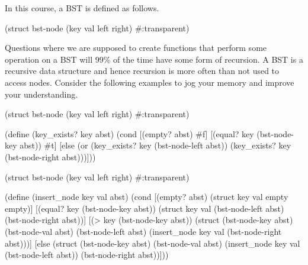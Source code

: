 In this course, a BST is defined as follows.\\

\begin{code}[Lisp]
(struct bst-node (key val left right) #:transparent)
\end{code}

Questions where we are supposed to create functions that perform some operation on a BST will 99\% of the time have some form of recursion. A BST is a recursive data structure and hence recursion is more often than not used to access nodes. Consider the following examples to jog your memory and improve your understanding.\\


\begin{code}[Lisp]
(struct bst-node (key val left right) #:transparent)

(define (key_exists? key abst)
	(cond
		[(empty? abst) #f]
		[(equal? key (bst-node-key abst)) #t]
		[else (or (key_exists? key (bst-node-left abst))
		          (key_exists? key (bst-node-right abst)))]))
\end{code}

\clearpage
{}

\begin{code}[Lisp]
(struct bst-node (key val left right) #:transparent)

(define (insert_node key val abst)
	(cond
		[(empty? abst) (struct key val empty empty)]
		[(equal? key (bst-node-key abst)) (struct key val 
		                                          (bst-node-left abst)
		                                          (bst-node-right abst))]
		[(> key (bst-node-key abst)) (struct (bst-node-key abst)
		                                     (bst-node-val abst)
		                                     (bst-node-left abst)
		                                     (insert_node key val 
		                                                  (bst-node-right abst)))]
		[else (struct (bst-node-key abst)
		              (bst-node-val abst)
		              (insert_node key val (bst-node-left abst))
		              (bst-node-right abst))]))
\end{code}

